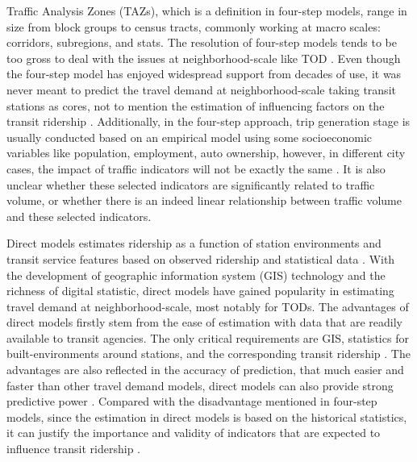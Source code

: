 Traffic Analysis Zones (TAZs), which is a definition in four-step models, range in size from block groups to census tracts, commonly working at macro scales: corridors, subregions, and stats. The resolution of four-step models tends to be too gross to deal with the issues at neighborhood-scale like TOD \cite{cervero2006alternative}. Even though the four-step model has enjoyed widespread support from decades of use, it was never meant to predict the travel demand at neighborhood-scale taking transit stations as cores, not to mention the estimation of influencing factors on the transit ridership \cite{cervero2006alternative,chu2004ridership,duduta2013direct}. Additionally, in the four-step approach, trip generation stage is usually conducted based on an empirical model using some socioeconomic variables like population, employment, auto ownership, however, in different city cases, the impact of traffic indicators will not be exactly the same \cite{jones1983demand}. It is also unclear whether these selected indicators are significantly related to traffic volume, or whether there is an indeed linear relationship between traffic volume and these selected indicators. 

Direct models estimates ridership as a function of station environments and transit service features based on observed ridership and statistical data \cite{cervero2006alternative}. With the development of geographic information system (GIS) technology and the richness of digital statistic, direct models have gained popularity in estimating travel demand at neighborhood-scale, most notably for TODs. The advantages of direct models firstly stem from the ease of estimation with data that are readily available to transit agencies. The only critical requirements are GIS, statistics for built-environments around stations, and the corresponding transit ridership \cite{guerra2012half}. The advantages are also reflected in the accuracy of prediction, that much easier and faster than other travel demand models, direct models can also provide strong predictive power \cite{lane2006sketch}. Compared with the disadvantage mentioned in four-step models, since the estimation in direct models is based on the historical statistics, it can justify the importance and validity of indicators that are expected to influence transit ridership \cite{walters2003forecasting}.

%
